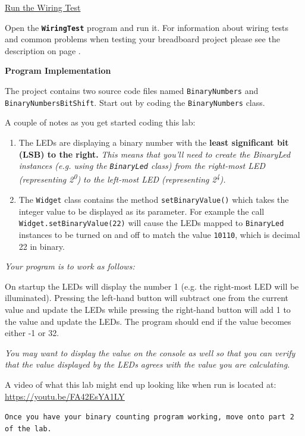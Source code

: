 \underline{Run the Wiring Test}

Open the \textbf{\texttt{WiringTest}} program and run it. For information about wiring tests and common problems when testing your breadboard project please see the description on page \pageref{wiringTestDescription}.


\textbf{Program Implementation}

The project contains two source code files named \texttt{BinaryNumbers} and \texttt{BinaryNumbersBitShift}. Start out by coding the \texttt{BinaryNumbers} class.

A couple of notes as you get started coding this lab:

\begin{enumerate}
	\item The LEDs are displaying a binary number with the \textbf{least significant bit (LSB) to the right.} \textit{This means that you'll need to create the BinaryLed instances (e.g. using the \texttt{BinaryLed} class) from the right-most LED (representing 2\textsuperscript{0}) to the left-most LED (representing 2\textsuperscript{4}).}
	\item The \texttt{Widget} class contains the method \texttt{setBinaryValue()} which takes the integer value to be displayed as its parameter. For example the call \texttt{Widget.setBinaryValue(22)} will cause the LEDs mapped to \texttt{BinaryLed} instances to be turned on and off to match the value \texttt{10110}, which is decimal 22 in binary.
\end{enumerate}

\textit{Your program is to work as follows:}

On startup the LEDs will display the number 1 (e.g. the right-most LED will be illuminated). Pressing the left-hand button will subtract one from the current value and update the LEDs while pressing the right-hand button will add 1 to the value and update the LEDs. The program should end if the value becomes either -1 or 32.

\textit{You may want to display the value on the console as well so that you can verify that the value displayed by the LEDs agrees with the value you are calculating.}

A video of what this lab might end up looking like when run is located at: \url{https://youtu.be/FA42EsYA1LY}

\texttt{Once you have your binary counting program working, move onto part 2 of the lab.}

